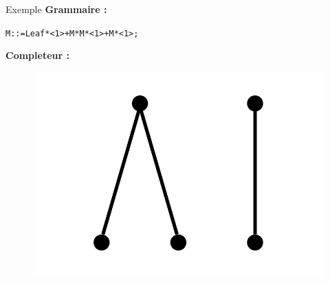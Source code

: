 \documentclass{beamer}
\begin{document}
\begin{frame}{Exemple}
\textbf{Grammaire :} \\

\begin{alltt}
\hspace{10 mm} M::= Leaf * <1> + M * M * <1> + M * <1>;
\end{alltt}
\textbf{Completeur :} \\
\begin{figure}[h]
\centering
\includegraphics[scale=0.2]{const.png}
\end{figure}
\end{frame}
\end{document}
